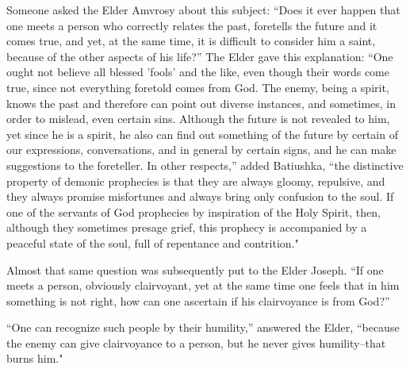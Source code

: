 Someone asked the Elder Amvrosy about this subject: “Does it ever happen that one meets a person who correctly relates the past, foretells the future and it comes true, and yet, at the same time, it is difficult to consider him a saint, because of the other aspects of his life?” The Elder gave this explanation: “One ought not believe all blessed 'fools' and the like, even though their words come true, since not everything foretold comes from God. The enemy, being a spirit, knows the past and therefore can point out diverse instances, and sometimes, in order to mislead, even certain sins. Although the future is not revealed to him, yet since he is a spirit, he also can find out something of the future by certain of our expressions, conversations, and in general by certain signs, and he can make suggestions to the foreteller. In other respects,” added Batiushka, “the distinctive property of demonic prophecies is that they are always gloomy, repulsive, and they always promise misfortunes and always bring only confusion to the soul. If one of the servants of God prophecies by inspiration of the Holy Spirit, then, although they sometimes presage grief, this prophecy is accompanied by a peaceful state of the soul, full of repentance and contrition."

Almost that same question was subsequently put to the Elder Joseph. “If one meets a person, obviously clairvoyant, yet at the same time one feels that in him something is not right, how can one ascertain if his clairvoyance is from God?”

“One can recognize such people by their humility,” answered the Elder, “because the enemy can give clairvoyance to a person, but he never gives humility--that burns him."